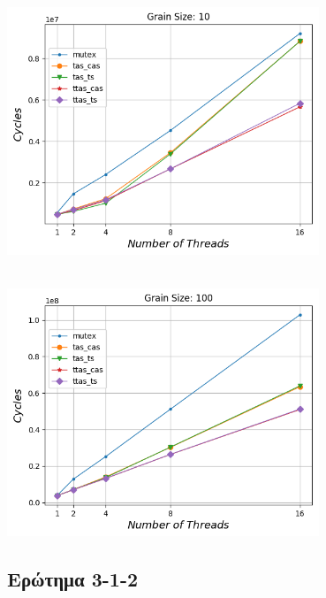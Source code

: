 \begin{minipage}{\textwidth}
   \begin{center}
      \\
      \vspace{3mm}
      \includegraphics[width=0.7\textwidth, frame]{./graphs/sniper/cycles/grain-10.png}
      \vspace{6mm}
   \end{center}
\end{minipage}

\begin{minipage}{\textwidth}
   \begin{center}
      \\
      \vspace{3mm}
      \includegraphics[width=0.7\textwidth, frame]{./graphs/sniper/cycles/grain-100.png}
      \vspace{6mm}
   \end{center}
\end{minipage}

\subsection{Ερώτημα 3-1-2}
